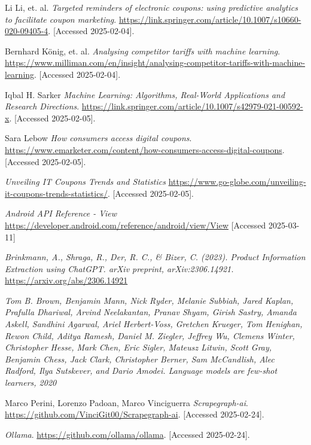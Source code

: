 \documentclass[licencjacka,en]{pracamgr}
\begin{document}
\begin{thebibliography}{199}
Li Li, et. al.
\textit{Targeted reminders of electronic coupons: using predictive analytics to facilitate coupon marketing}.
\url{https://link.springer.com/article/10.1007/s10660-020-09405-4}.
[Accessed 2025-02-04].

Bernhard König, et. al.
\textit{Analysing competitor tariffs with machine learning}.
\url{https://www.milliman.com/en/insight/analysing-competitor-tariffs-with-machine-learning}.
[Accessed 2025-02-04].

Iqbal H. Sarker
\textit{Machine Learning: Algorithms, Real-World Applications and Research Directions}.
\url{https://link.springer.com/article/10.1007/s42979-021-00592-x}.
[Accessed 2025-02-05].

Sara Lebow
\textit{How consumers access digital coupons}.
\url{https://www.emarketer.com/content/how-consumers-access-digital-coupons}.
[Accessed 2025-02-05].

\textit{Unveiling IT Coupons Trends and Statistics}
\url{https://www.go-globe.com/unveiling-it-coupons-trends-statistics/}.
[Accessed 2025-02-05].

\textit{Android API Reference - View}
\url{https://developer.android.com/reference/android/view/View}
[Accessed 2025-03-11]

\textit{Brinkmann, A., Shraga, R., Der, R. C., \& Bizer, C. (2023). Product Information Extraction using ChatGPT. arXiv preprint, arXiv:2306.14921.}
\url{https://arxiv.org/abs/2306.14921}

\textit{Tom B. Brown, Benjamin Mann, Nick Ryder, Melanie Subbiah, Jared
Kaplan, Prafulla Dhariwal, Arvind Neelakantan, Pranav Shyam, Girish
Sastry, Amanda Askell, Sandhini Agarwal, Ariel Herbert-Voss, Gretchen
Krueger, Tom Henighan, Rewon Child, Aditya Ramesh, Daniel M.
Ziegler, Jeffrey Wu, Clemens Winter, Christopher Hesse, Mark Chen,
Eric Sigler, Mateusz Litwin, Scott Gray, Benjamin Chess, Jack Clark,
Christopher Berner, Sam McCandlish, Alec Radford, Ilya Sutskever, and
Dario Amodei. Language models are few-shot learners, 2020}

Marco Perini, Lorenzo Padoan, Marco Vinciguerra
\textit{Scrapegraph-ai}.
\url{https://github.com/VinciGit00/Scrapegraph-ai}.
[Accessed 2025-02-24].

\textit{Ollama}.
\url{https://github.com/ollama/ollama}.
[Accessed 2025-02-24].


\end{thebibliography}
\end{document}
